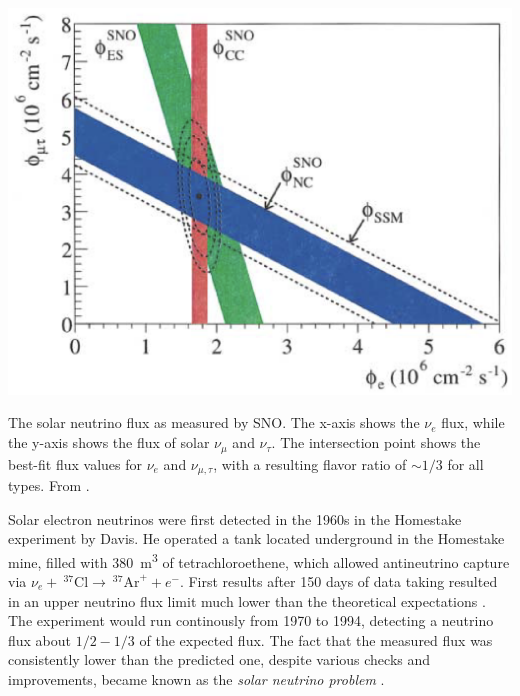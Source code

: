 \documentclass[
    a4paper, %
    fontsize=10pt, %
    twoside=false, %
    numbers=noenddot, %
    fontmethod=tex,
]{kaobook}
\begin{document}
\begin{marginfigure}
    \includegraphics{theory/sno_flux.png}
    \caption[Solar neutrino flux measured by SNO]{The solar neutrino flux as measured by SNO. The x-axis shows the $\nu_e$ flux, while the y-axis shows the flux of solar $\nu_\mu$ and $\nu_\tau$. The intersection point shows the best-fit flux values for $\nu_e$ and $\nu_{\mu,\tau}$, with a resulting flavor ratio of $\sim 1/3$ for all types. From \cite{Ahmad2002}.}
\end{marginfigure}

Solar electron neutrinos were first detected in the 1960s in the Homestake experiment by Davis. He operated a tank located underground in the Homestake mine, filled with \SI{380}{\meter\cubed} of tetrachloroethene, which allowed antineutrino capture via $\nu_e +~ ^{37}\text{Cl} \rightarrow ~ ^{37}\text{Ar}^+ + e^-$. First results after 150 days of data taking resulted in an upper neutrino flux limit much lower than the theoretical expectations . The experiment would run continously from 1970 to 1994, detecting a neutrino flux about $1/2-1/3$ of the expected flux. The fact that the measured flux was consistently lower than the predicted one, despite various checks and improvements, became known as the \textit{solar neutrino problem} .
\end{document}

